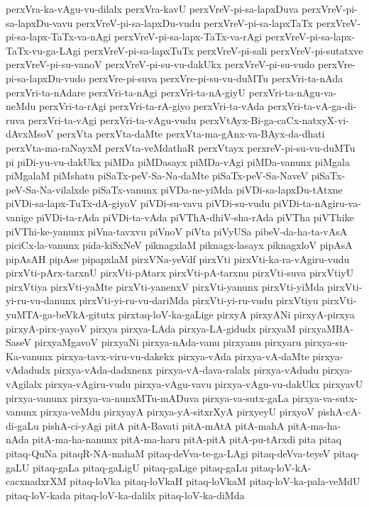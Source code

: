 {perxVra-ka-vAgu-vu-dilalx
perxVra-kavU
perxVreV-pi-sa-lapxDuva
perxVreV-pi-sa-lapxDu-vavu
perxVreV-pi-sa-lapxDu-vudu
perxVreV-pi-sa-lapxTaTx
perxVreV-pi-sa-lapx-TaTx-va-nAgi
perxVreV-pi-sa-lapx-TaTx-va-rAgi
perxVreV-pi-sa-lapx-TaTx-vu-ga-LAgi
perxVreV-pi-sa-lapxTuTx
perxVreV-pi-sali
perxVreV-pi-sutatxve
perxVreV-pi-su-vanoV
perxVreV-pi-su-vu-dakUkx
perxVreV-pi-su-vudo
perxVre-pi-sa-lapxDu-vudo
perxVre-pi-suva
perxVre-pi-su-vu-duMTu
perxVri-ta-nAda
perxVri-ta-nAdare
perxVri-ta-nAgi
perxVri-ta-nA-giyU
perxVri-ta-nAgu-va-neMdu
perxVri-ta-rAgi
perxVri-ta-rA-giyo
perxVri-ta-vAda
perxVri-ta-vA-ga-di-ruva
perxVri-ta-vAgi
perxVri-ta-vAgu-vudu
perxVtAyx-Bi-ga-caCx-natxyX-vi-dAvxMsoV
perxVta
perxVta-daMte
perxVta-ma-gAnx-va-BAyx-da-dhati
perxVta-ma-raNayxM
perxVta-veMdathaR
perxVtayx
perxreV-pi-su-vu-duMTu
pi
piDi-yu-vu-dakUkx
piMDa
piMDasayx
piMDa-vAgi
piMDa-vanunx
piMgala
piMgalaM
piMshatu
piSaTx-peV-Sa-Na-daMte
piSaTx-peV-Sa-NaveV
piSaTx-peV-Sa-Na-vilalxde
piSaTx-vanunx
piVDa-ne-yiMda
piVDi-sa-lapxDu-tAtxne
piVDi-sa-lapx-TuTx-dA-giyoV
piVDi-su-vavu
piVDi-su-vudu
piVDi-ta-nAgiru-va-vanige
piVDi-ta-rAda
piVDi-ta-vAda
piVThA-dhiV-sha-rAda
piVTha
piVThike
piVThi-ke-yanunx
piVna-tavxvu
piVnoV
piVta
piVyUSa
pibeV-da-ha-ta-vAsA
piciCx-la-vanunx
pida-kiSxNeV
piknagxlaM
piknagx-lasayx
piknagxloV
pipAsA
pipAsAH
pipAse
pipapxlaM
pirxVNa-yeVdf
pirxVti
pirxVti-ka-ra-vAgiru-vudu
pirxVti-pArx-tarxnU
pirxVti-pAtarx
pirxVti-pA-tarxnu
pirxVti-suva
pirxVtiyU
pirxVtiya
pirxVti-yaMte
pirxVti-yanenxV
pirxVti-yanunx
pirxVti-yiMda
pirxVti-yi-ru-vu-danunx
pirxVti-yi-ru-vu-dariMda
pirxVti-yi-ru-vudu
pirxVtiyu
pirxVti-yuMTA-ga-beVkA-gitutx
pirxtaq-loV-ka-gaLige
pirxyA
pirxyANi
pirxyA-pirxya
pirxyA-pirx-yayoV
pirxya
pirxya-LAda
pirxya-LA-gidudx
pirxyaM
pirxyaMBA-SaseV
pirxyaMgavoV
pirxyaNi
pirxya-nAda-vanu
pirxyanu
pirxyaru
pirxya-su-Ka-vanunx
pirxya-tavx-viru-vu-dakekx
pirxya-vAda
pirxya-vA-daMte
pirxya-vAdadudx
pirxya-vAda-dadxnenx
pirxya-vA-dava-ralalx
pirxya-vAdudu
pirxya-vAgilalx
pirxya-vAgiru-vudu
pirxya-vAgu-vavu
pirxya-vAgu-vu-dakUkx
pirxyavU
pirxya-vanunx
pirxya-va-nunxMTu-mADuva
pirxya-va-sutx-gaLa
pirxya-va-sutx-vanunx
pirxya-veMdu
pirxyayA
pirxya-yA-sitxrXyA
pirxyeyU
pirxyoV
pishA-cA-di-gaLu
pishA-ci-yAgi
pitA
pitA-Bavati
pitA-mAtA
pitA-mahA
pitA-ma-ha-nAda
pitA-ma-ha-nanunx
pitA-ma-haru
pitA-pitA
pitA-pu-tArxdi
pita
pitaq
pitaq-QuNa
pitaqR-NA-mahaM
pitaq-deVva-te-ga-LAgi
pitaq-deVva-teyeV
pitaq-gaLU
pitaq-gaLa
pitaq-gaLigU
pitaq-gaLige
pitaq-gaLu
pitaq-loV-kA-cacxnadxrXM
pitaq-loVka
pitaq-loVkaH
pitaq-loVkaM
pitaq-loV-ka-pala-veMdU
pitaq-loV-kada
pitaq-loV-ka-dalilx
pitaq-loV-ka-diMda
}
